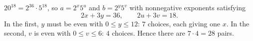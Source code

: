 $20^{18}=2^{36}\cdot5^{18}$, so $a=2^x5^u$ and $b=2^y5^v$ with nonnegative exponents satisfying
\[2x+3y=36,\qquad 2u+3v=18.\]
In the first, $y$ must be even with $0\le y\le12$: $7$ choices, each giving one $x$. In the second, $v$ is even with $0\le v\le6$: $4$ choices. Hence there are $7\cdot4=\boxed{28}$ pairs.
